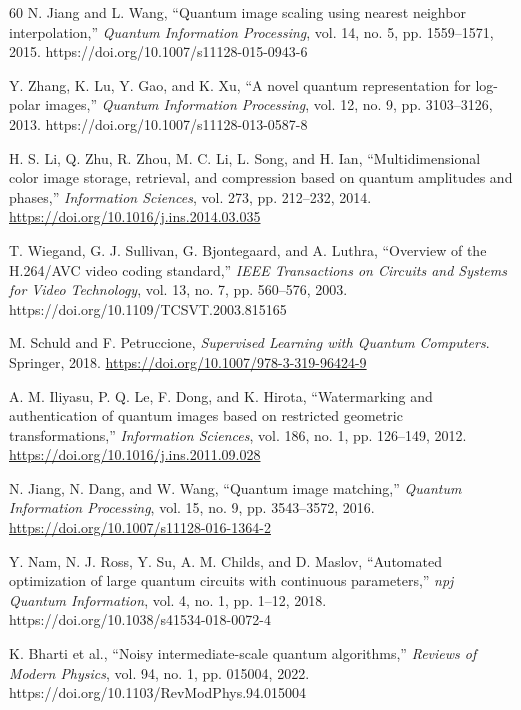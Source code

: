 \documentclass[11pt,a4paper]{article}
\begin{document}
\begin{thebibliography}{60}
N. Jiang and L. Wang, ``Quantum image scaling using nearest neighbor interpolation,'' \textit{Quantum Information Processing}, vol. 14, no. 5, pp. 1559--1571, 2015. https://doi.org/10.1007/s11128-015-0943-6

Y. Zhang, K. Lu, Y. Gao, and K. Xu, ``A novel quantum representation for log-polar images,'' \textit{Quantum Information Processing}, vol. 12, no. 9, pp. 3103--3126, 2013. https://doi.org/10.1007/s11128-013-0587-8

H. S. Li, Q. Zhu, R. Zhou, M. C. Li, L. Song, and H. Ian, ``Multidimensional color image storage, retrieval, and compression based on quantum amplitudes and phases,'' \textit{Information Sciences}, vol. 273, pp. 212--232, 2014. \url{https://doi.org/10.1016/j.ins.2014.03.035}


T. Wiegand, G. J. Sullivan, G. Bjontegaard, and A. Luthra, ``Overview of the H.264/AVC video coding standard,'' \textit{IEEE Transactions on Circuits and Systems for Video Technology}, vol. 13, no. 7, pp. 560--576, 2003. https://doi.org/10.1109/TCSVT.2003.815165

M. Schuld and F. Petruccione, \textit{Supervised Learning with Quantum Computers}. Springer, 2018. \url{https://doi.org/10.1007/978-3-319-96424-9}

A. M. Iliyasu, P. Q. Le, F. Dong, and K. Hirota, ``Watermarking and authentication of quantum images based on restricted geometric transformations,'' \textit{Information Sciences}, vol. 186, no. 1, pp. 126--149, 2012. \url{https://doi.org/10.1016/j.ins.2011.09.028}

N. Jiang, N. Dang, and W. Wang, ``Quantum image matching,'' \textit{Quantum Information Processing}, vol. 15, no. 9, pp. 3543--3572, 2016. \url{https://doi.org/10.1007/s11128-016-1364-2}

Y. Nam, N. J. Ross, Y. Su, A. M. Childs, and D. Maslov, ``Automated optimization of large quantum circuits with continuous parameters,'' \textit{npj Quantum Information}, vol. 4, no. 1, pp. 1--12, 2018. https://doi.org/10.1038/s41534-018-0072-4

K. Bharti et al., ``Noisy intermediate-scale quantum algorithms,'' \textit{Reviews of Modern Physics}, vol. 94, no. 1, pp. 015004, 2022. https://doi.org/10.1103/RevModPhys.94.015004


\end{thebibliography}
\end{document}
